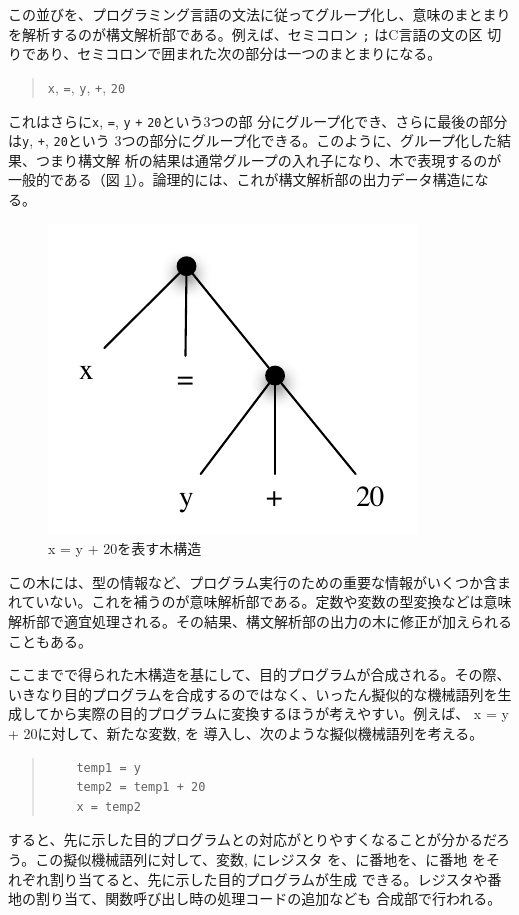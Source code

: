この並びを、プログラミング言語の文法に従ってグループ化し、意味のまとまり
を解析するのが構文解析部である。例えば、セミコロン \verb|;| はC言語の文の区
切りであり、セミコロンで囲まれた次の部分は一つのまとまりになる。
\begin{quote}
 \verb|x|, \verb|=|, \verb|y|, \verb|+|, \verb|20|
\end{quote}
これはさらに\verb|x|, \verb|=|, \verb|y| \verb|+| \verb|20|という3つの部
分にグループ化でき、さらに最後の部分は\verb|y|, \verb|+|, \verb|20|という
3つの部分にグループ化できる。このように、グループ化した結果、つまり構文解
析の結果は通常グループの入れ子になり、木で表現するのが一般的である（図
\ref{112135_29Mar06}）。論理的には、これが構文解析部の出力データ構造にな
る。

\begin{figure}
 \begin{center}
  \includegraphics[scale=0.8]{figure/tree_structure.pdf}
 \end{center}
 \caption{{\sffamily x = y + 20}を表す木構造}
 \label{112135_29Mar06}
\end{figure}

この木には、型の情報など、プログラム実行のための重要な情報がいくつか含ま
れていない。これを補うのが意味解析部である。定数や変数の型変換などは意味
解析部で適宜処理される。その結果、構文解析部の出力の木に修正が加えられる
こともある。

ここまでで得られた木構造を基にして、目的プログラムが合成される。その際、
いきなり目的プログラムを合成するのではなく、いったん擬似的な機械語列を生
成してから実際の目的プログラムに変換するほうが考えやすい。例えば、
{\sffamily x = y + 20}に対して、新たな変数, を
導入し、次のような擬似機械語列を考える。
\begin{quote}
\begin{verbatim}
	temp1 = y
	temp2 = temp1 + 20
	x = temp2
\end{verbatim}
\end{quote}
すると、先に示した目的プログラムとの対応がとりやすくなることが分かるだろ
う。この擬似機械語列に対して、変数, にレジスタ
を、に番地を、に番地
をそれぞれ割り当てると、先に示した目的プログラムが生成
できる。レジスタや番地の割り当て、関数呼び出し時の処理コードの追加なども
合成部で行われる。

